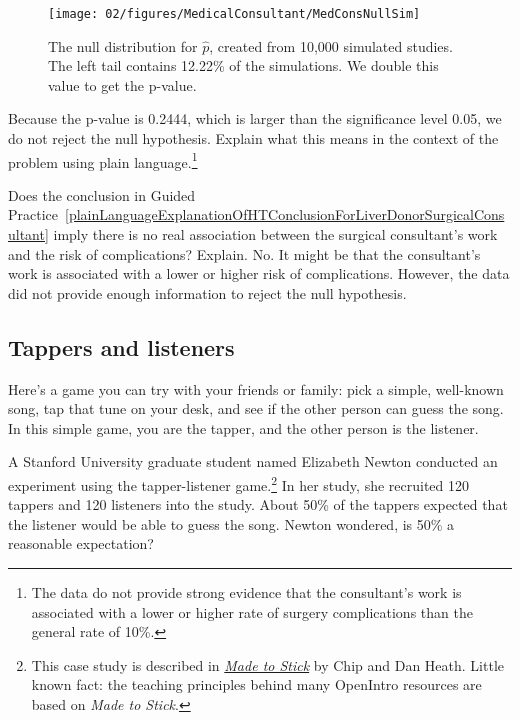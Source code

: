 \begin{figure}[ht]
\centering
\texttt{[image: 02/figures/MedicalConsultant/MedConsNullSim]}
\caption{The null distribution for $\hat{p}$, created from 10,000 simulated studies. The left tail contains 12.22\% of the simulations. We double this value to get the p-value.}
\label{MedConsNullSim}
\end{figure}

\begin{exercise} \label{plainLanguageExplanationOfHTConclusionForLiverDonorSurgicalConsultant}
Because the p-value is 0.2444, which is larger than the significance level 0.05, we do not reject the null hypothesis. Explain what this means in the context of the problem using plain language.\footnote{The data do not provide strong evidence that the consultant's work is associated with a lower or higher rate of surgery complications than the general rate of 10\%.}
\end{exercise}

\begin{example}{Does the conclusion in Guided Practice~\ref{plainLanguageExplanationOfHTConclusionForLiverDonorSurgicalConsultant} imply there is no real association between the surgical consultant's work and the risk of complications? Explain.}
No. It might be that the consultant's work is associated with a lower or higher risk of complications. However, the data did not provide enough information to reject the null hypothesis. %
\end{example}


\subsection{Tappers and listeners}

Here's a game you can try with your friends or family: pick a simple, well-known song, tap that tune on your desk, and see if the other person can guess the song. In this simple game, you are the tapper, and the other person is the listener.

A Stanford University graduate student named Elizabeth Newton conducted an experiment using the tapper-listener game.\footnote{This case study is described in \emph{\href{http://www.openintro.org/redirect.php?go=made-to-stick&redirect=simulation_textbook_pdf_preliminary}{Made to Stick}} by Chip and Dan Heath. Little known fact: the teaching principles behind many OpenIntro resources are based on \emph{Made to Stick}.} In her study, she recruited 120 tappers and 120 listeners into the study. About 50\% of the tappers expected that the listener would be able to guess the song. Newton wondered, is 50\% a reasonable expectation?


